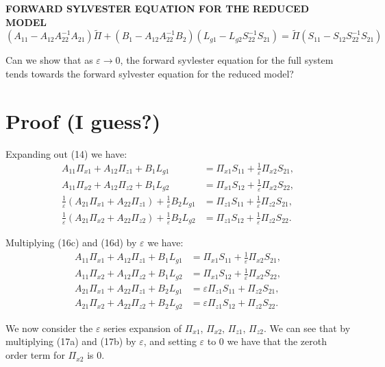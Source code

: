 \documentclass{article}
\begin{document}
\textbf{FORWARD SYLVESTER EQUATION FOR THE REDUCED MODEL}
\begin{equation}
    (A_{11}-A_{12} A_{22} ^{-1} A_{21}) \tilde{\Pi} + (B_1 - A_{12} A_{22}^{-1} B_2) (L_{g1} - L_{g2} S_{22} ^ {-1} S_{21}) 
    = \tilde{\Pi} (S_{11}-S_{12} S_{22} ^{-1} S_{21})
\end{equation}


Can we show that as $\varepsilon \to 0$, the forward syvlester equation for the full system tends 
towards the forward sylvester equation for the reduced model?

\section{Proof (I guess?)}
Expanding out (14) we have: 
\begin{subequations}\label{eq:block-expansion}
\begin{align}
A_{11}\Pi_{x1}+A_{12}\Pi_{z1}+B_1L_{g1}
  &= \Pi_{x1}S_{11}+\frac{1}{\varepsilon}\Pi_{x2}S_{21}, \\
A_{11}\Pi_{x2}+A_{12}\Pi_{z2}+B_1L_{g2}
  &= \Pi_{x1}S_{12}+\frac{1}{\varepsilon}\Pi_{x2}S_{22}, \\
\frac{1}{\varepsilon}\!\left(A_{21}\Pi_{x1}+A_{22}\Pi_{z1}\right)+\frac{1}{\varepsilon}B_2L_{g1}
  &= \Pi_{z1}S_{11}+\frac{1}{\varepsilon}\Pi_{z2}S_{21}, \\
\frac{1}{\varepsilon}\!\left(A_{21}\Pi_{x2}+A_{22}\Pi_{z2}\right)+\frac{1}{\varepsilon}B_2L_{g2}
  &= \Pi_{z1}S_{12}+\frac{1}{\varepsilon}\Pi_{z2}S_{22}.
\end{align}
\end{subequations}

Multiplying (16c) and (16d) by $\varepsilon$ we have: 
\begin{subequations}
\begin{align}
A_{11}\Pi_{x1}+A_{12}\Pi_{z1}+B_1L_{g1}
  &= \Pi_{x1}S_{11}+\frac{1}{\varepsilon}\Pi_{x2}S_{21}, \\
A_{11}\Pi_{x2}+A_{12}\Pi_{z2}+B_1L_{g2}
  &= \Pi_{x1}S_{12}+\frac{1}{\varepsilon}\Pi_{x2}S_{22}, \\
A_{21}\Pi_{x1}+A_{22}\Pi_{z1} + B_2L_{g1}
  &= \varepsilon \Pi_{z1}S_{11} + \Pi_{z2}S_{21}, \\
A_{21}\Pi_{x2}+A_{22}\Pi_{z2} + B_2L_{g2}
  &= \varepsilon \Pi_{z1}S_{12} + \Pi_{z2}S_{22}.
\end{align}
\end{subequations}

We now consider the $\varepsilon$ series expansion of $\Pi_{x1}$, $\Pi_{x2}$, $\Pi_{z1}$, $\Pi_{z2}$.
We can see that by multiplying (17a) and (17b) by $\varepsilon$, and setting  $\varepsilon$ to 0 we have that the zeroth order term
for $\Pi_{x2}$ is 0.  
\end{document}
